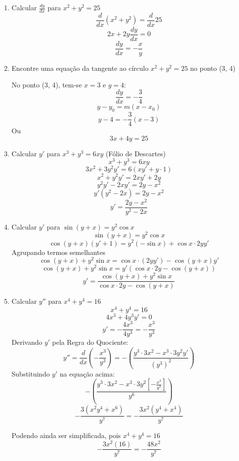 \begin{enumerate}
	\item Calcular $\displaystyle\frac{dy}{dx}$ para $x^2+y^2=25$
		$$\frac{d}{dx}(x^2+y^2)=\frac{d}{dx}25$$
		$$2x+2y\frac{dy}{dx}=0$$
		$$\frac{dy}{dx}=-\frac{x}{y}$$
	\item Encontre uma equação da tangente ao círculo $x^2+y^2=25$ no ponto (3, 4)
		
		No ponto (3, 4), tem-se $x=3$ e $y=4$:
		$$\frac{dy}{dx}=-\frac{3}{4}$$
		$$y-y_0=m(x-x_0)$$
		$$y-4=-\frac{3}{4}(x-3)$$
		Ou $$3x+4y=25$$
	\item Calcular $y'$ para $x^3+y^3=6xy$ (Fólio de Descartes)
		$$x^3+y^3=6xy$$
		$$3x^2+3y^2y'=6(xy'+y\cdot1)$$
		$$x^2+y^2y'=2xy'+2y$$
		$$y^2y'-2xy'=2y-x^2$$
		$$y'(y^2-2x)=2y-x^2$$
		$$y'=\frac{2y-x^2}{y^2-2x}$$
	\item Calcular $y'$ para $\sin(y+x)=y^2\cos x$
		$$\sin(y+x)=y^2\cos x$$
		$$\cos(y+x)(y'+1)=y^2(-\sin x)+\cos x\cdot2yy'$$
		Agrupando termos semelhantes
		$$\cos(y+x)+y^2\sin x=\cos x\cdot(2yy')-\cos(y+x)y'$$
		$$\cos(y+x)+y^2\sin x=y'(\cos x\cdot2y-\cos(y+x))$$
		$$y'=\frac{\cos(y+x)+y^2\sin x}{\cos x\cdot2y-\cos(y+x)}$$
	\item Calcular $y''$ para $x^4+y^4=16$
		$$x^4+y^4=16$$
		$$4x^3+4y^3y'=0$$
		$$y'=-\frac{4x^3}{4y^3}=-\frac{x^3}{y^3}$$
		Derivando $y'$ pela Regra do Quociente:
		$$y''=\frac{d}{dx}\left(-\frac{x^3}{y^3}\right)=-\left(\frac{y^3\cdot3x^2-x^3\cdot3y^2y'}{(y^3)^2}\right)$$
		Substituindo $y'$ na equação acima:
		$$-\left(\frac{y^3\cdot3x^2-x^3\cdot3y^2\left[-\displaystyle\frac{x^3}{y^3}\right]}{y^6}\right)$$
		$$-\frac{3(x^2y^4+x^6)}{y^7}=-\frac{3x^2(y^4+x^4)}{y^7}$$
		
		Podendo ainda ser simplificada, pois $x^4+y^4=16$
		$$-\frac{3x^2(16)}{y^7}=-\frac{48x^2}{y^7}$$
\end{enumerate}